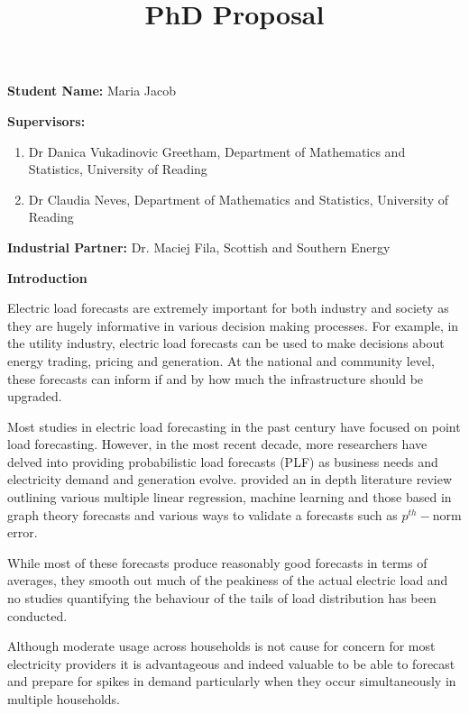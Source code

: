 \documentclass[a4paper]{article}
\title{PhD Proposal}
\begin{document}
\maketitle

\noindent \textbf{Student Name:} Maria Jacob \newline

\noindent \textbf{Supervisors:} \begin{enumerate} \item Dr Danica Vukadinovic Greetham, Department of Mathematics and Statistics, University of Reading \item Dr Claudia Neves, Department of Mathematics and Statistics, University of Reading \end{enumerate}

\noindent \textbf{Industrial Partner:} Dr. Maciej Fila, Scottish and Southern Energy \newline


\noindent \textbf{Introduction}

Electric load forecasts are extremely important for both industry and society as they are hugely informative in various decision making processes. For example, in the utility industry, electric load forecasts can be used to make decisions about energy trading, pricing and generation. At the national and community level, these forecasts can inform if and by how much the infrastructure should be upgraded.

Most studies in electric load forecasting in the past century have focused on point load forecasting. However, in the most recent decade, more researchers have delved into providing probabilistic load forecasts (PLF) as business needs and electricity demand and generation evolve. \citet{hong16} provided an in depth literature review outlining various multiple linear regression, machine learning and those based in graph theory forecasts and various ways to validate a forecasts such as $p^{th}-$norm error.

While most of these forecasts produce reasonably good forecasts in terms of averages, they smooth out much of the peakiness of the actual electric load and no studies quantifying the behaviour of the tails of load distribution has been conducted.

Although moderate usage across households is not cause for concern for most electricity providers it is advantageous and indeed valuable to be able to forecast and prepare for spikes in demand particularly when they occur simultaneously in multiple households. 
\end{document}

